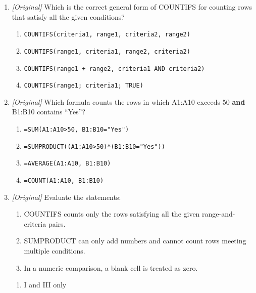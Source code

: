 \begin{enumerate}[label=\textbf{Q\arabic*.}, leftmargin=*]
  is correct?
  \begin{enumerate}[label=\Alph*.]
    \item \texttt{=A1+5} returns 5.
    \item \texttt{ISNUMBER(A1)} returns TRUE.
    \item \texttt{=A1+5} returns \texttt{\#VALUE!} because text is not a
      number.
    \item Text is treated as 0 in every arithmetic operation.
  \end{enumerate}
\item \textit{[Original]} Which is the correct general form of COUNTIFS for
  counting rows that satisfy all the given conditions?
  \begin{enumerate}[label=\Alph*.]
    \item \texttt{COUNTIFS(criteria1, range1, criteria2, range2)}
    \item \texttt{COUNTIFS(range1, criteria1, range2, criteria2)}
    \item \texttt{COUNTIFS(range1 + range2, criteria1 AND criteria2)}
    \item \texttt{COUNTIFS(range1; criteria1; TRUE)}
  \end{enumerate}
\item \textit{[Original]} Which formula counts the rows in which A1:A10 exceeds
  50 \textbf{and} B1:B10 contains ``Yes''?
  \begin{enumerate}[label=\Alph*.]
    \item \texttt{=SUM(A1:A10>50, B1:B10="Yes")}
    \item \texttt{=SUMPRODUCT((A1:A10>50)*(B1:B10="Yes"))}
    \item \texttt{=AVERAGE(A1:A10, B1:B10)}
    \item \texttt{=COUNT(A1:A10, B1:B10)}
  \end{enumerate}
\item \textit{[Original]} Evaluate the statements:
  \begin{enumerate}[label=\Roman*.]
    \item COUNTIFS counts only the rows satisfying all the given
      range-and-criteria pairs.
    \item SUMPRODUCT can only add numbers and cannot count rows meeting
      multiple conditions.
    \item In a numeric comparison, a blank cell is treated as zero.
  \end{enumerate}
  \begin{enumerate}[label=\Alph*.]
    \item I and III only

\end{enumerate}
\end{enumerate}
